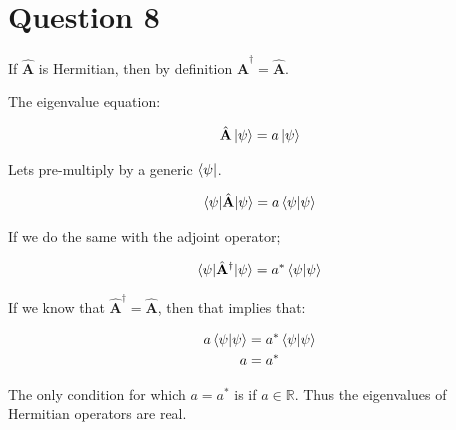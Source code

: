 \documentclass{article}
\let\oldhat\hat
\renewcommand{\hat}[1]{\oldhat{\mathbf{#1}}}
\begin{document}
\section{Question 8}

If $\hat{A}$ is Hermitian, then by definition $\hat{A}^\dagger = \hat{A}$.

The eigenvalue equation:

\begin{gather}
    \hat{A}\ket{\psi} = a\ket{\psi}
\end{gather}

Lets pre-multiply by a generic $\bra{\psi}$.

\begin{gather}
    \braket{\psi|\hat{A}|\psi} = a \braket{\psi|\psi}
\end{gather}

If we do the same with the adjoint operator;

\begin{gather}
    \braket{\psi|\hat{A}^\dagger|\psi} = a^* \braket{\psi|\psi}
\end{gather}

If we know that $\hat{A}^\dagger = \hat{A}$, then that implies that:

\begin{gather}
    a \braket{\psi|\psi} = a^* \braket{\psi|\psi}\\
    a = a^*
\end{gather}

The only condition for which $a = a^*$ is if $a \in \mathbb{R}$. Thus the eigenvalues of Hermitian operators are real.
\end{document}
